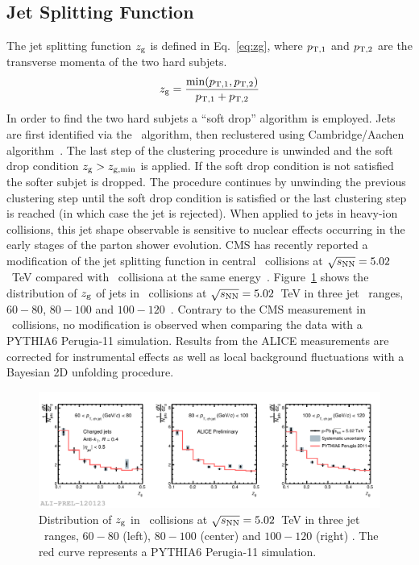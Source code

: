 \documentclass[10pt]{article}
\begin{document}
\subsection{Jet Splitting Function}
The jet splitting function $z_{\rm g}$ is defined in Eq.~\ref{eq:zg}, where $p_{\rm T,1}$ and $p_{\rm T,2}$ are the transverse momenta
of the two hard subjets.
\begin{equation}
z_{\rm g} = \frac{\min({p_{\rm T,1},p_{\rm T,2}})}{p_{\rm T,1}+p_{\rm T,2}}
\label{eq:zg}
\end{equation}
In order to find the two hard subjets a ``soft drop'' algorithm is employed. Jets are first identified via the \antikt\ algorithm, then reclustered using Cambridge/Aachen algorithm~\cite{}.
The last step of the clustering procedure is unwinded and the soft drop condition $z_{\rm g} > z_{\rm g, min}$ is applied. If the soft drop condition is not satisfied the softer subjet is dropped.
The procedure continues by unwinding the previous clustering step until the soft drop condition is satisfied or the last clustering step is reached (in which case the jet is rejected).
When applied to jets in heavy-ion collisions, this jet shape observable is sensitive to nuclear effects occurring in the early stages of the parton shower evolution.
CMS has recently reported a modification of the jet splitting function in central \PbPb\ collisions at $\sqrt{s_{\rm NN}}=5.02$~TeV compared with
\pp\ collisiona at the same energy~\cite{CMS:2017a}.
Figure~\ref{fig:zgppb} shows the distribution of $z_{\rm g}$ of jets in \pPb\ collisions at $\sqrt{s_{\rm NN}}=5.02$~TeV in three jet \pt\ ranges, $60-80$, $80-100$ and $100-120$~\GeVc. 
Contrary to the CMS measurement in \PbPb\ collisions, no modification is observed when comparing the data with a PYTHIA6 Perugia-11 simulation.
Results from the ALICE measurements are corrected for instrumental effects as well as local background fluctuations with a Bayesian 2D unfolding procedure.
\begin{figure}[tb]
\centering
\includegraphics[width=.85\textwidth]{img/2017-Feb-01-zg_unfolded_20GeV_ALL}
\caption{Distribution of $z_{\rm g}$ in \pPb\ collisions at $\sqrt{s_{\rm NN}}=5.02$~TeV in three jet \pt\ ranges, $60-80$ (left), $80-100$ (center) and $100-120$ (right) \GeVc.
The red curve represents a PYTHIA6 Perugia-11 simulation.}
\label{fig:zgppb}
\end{figure}
\end{document}
